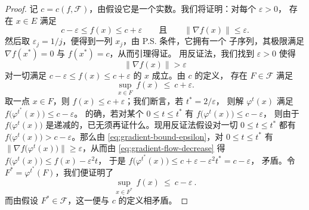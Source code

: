 \begin{proof}
记 $c=c(f,\mathcal{F})$，由假设它是一个实数。我们将证明：对每个 $\varepsilon>0$，%
存在 $x\in E$ 满足
\[
c-\varepsilon\leq f(x)\leq c+\varepsilon\qquad\text{且}\qquad\|\nabla f(x)\|\leq\varepsilon.
\]
然后取 $\varepsilon_{j}=1/j$，便得到一列 $x_{j}$，由 P.S. 条件，它拥有一个%
\trConverge{}子序列，其极限满足 $\nabla f(x^{*})=0$ 与 $f(x^{*})=c$，从而引理得证。%
用反证法，我们找到 $\varepsilon>0$ 使得
\begin{equation}\label{eq:gradient-bound-epsilon}
\|\nabla f(x)\|>\varepsilon
\end{equation}
对一切满足 $c-\varepsilon\leq f(x)\leq c+\varepsilon$ 的 $x$ 成立。由 $c$ 的定义，%
存在 $F\in\mathcal{F}$ 满足
\begin{equation}\label{eq:sup-f-estimate}
\sup_{x\in F}\,f(x)\ \leq\ c+\varepsilon.
\end{equation}
取一点 $x\in F$，则 $f(x)\leq c+\varepsilon$；我们断言，若 $t^{*}=2/\varepsilon$，%
则解 $\varphi^{t}(x)$ 满足 $f\bigl(\varphi^{t^{*}}(x)\bigr)\leq c-\varepsilon$。%
的确，若对某个 $0\leq t\leq t^{*}$ 有 $f\bigl(\varphi^{t}(x)\bigr)\leq c-\varepsilon$，%
则由于 $f\bigl(\varphi^{t}(x)\bigr)$ 是递减的，已无须再证什么。现用反证法假设对一切%
$0\leq t\leq t^{*}$ 都有 $f\bigl(\varphi^{t}(x)\bigr)>c-\varepsilon$。那么由%
\eqref{eq:gradient-bound-epsilon}，对 $0\leq t\leq t^{*}$ 有%
$\|\nabla f\bigl(\varphi^{t}(x)\bigr)\|\geq\varepsilon$，从而由%
\eqref{eq:gradient-flow-decrease} 得 $f\bigl(\varphi^{t}(x)\bigr)\leq f(x)-\varepsilon^{2}t$，%
于是 $f\bigl(\varphi^{t^{*}}(x)\bigr)\leq c+\varepsilon-\varepsilon^{2}t^{*}=c-\varepsilon$，%
矛盾。令 $F^{*}=\varphi^{t^{*}}(F)$，我们便证明了
\[
\sup_{x\in F^{*}}\,f(x)\ \leq\ c-\varepsilon\ .
\]
而由假设 $F^{*}\in\mathcal{F}$，这一\trEstimate{}便与 $c$ 的定义相矛盾。
\end{proof}

